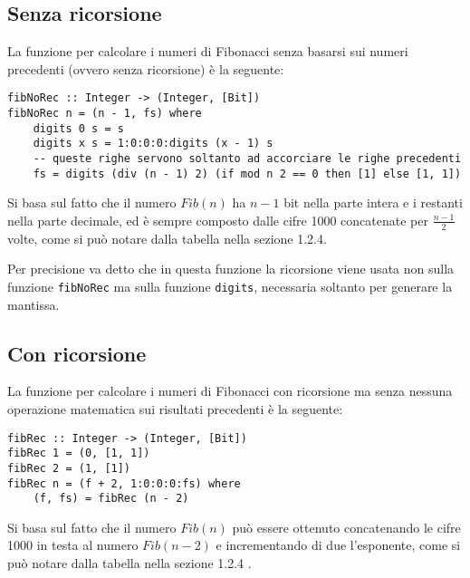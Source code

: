 \documentclass[Lau]{sapthesis}
\newcommand{\code}[1]{\colorbox{light-gray}{\texttt{#1}}}
\begin{document}
\subsection{Senza ricorsione}
La funzione per calcolare i numeri di Fibonacci senza basarsi sui numeri precedenti (ovvero senza ricorsione) è la seguente:
\begin{verbatim}
fibNoRec :: Integer -> (Integer, [Bit])
fibNoRec n = (n - 1, fs) where
    digits 0 s = s
    digits x s = 1:0:0:0:digits (x - 1) s
    -- queste righe servono soltanto ad accorciare le righe precedenti
    fs = digits (div (n - 1) 2) (if mod n 2 == 0 then [1] else [1, 1])
\end{verbatim}
Si basa sul fatto che il numero $Fib(n)$ ha $n-1$ bit nella parte intera e i restanti nella parte decimale, ed è sempre composto dalle cifre 1000 concatenate per $\frac{n-1}{2}$ volte, come si può notare dalla tabella nella sezione 1.2.4.

Per precisione va detto che in questa funzione la ricorsione viene usata non sulla funzione \code{fibNoRec} ma sulla funzione \code{digits}, necessaria soltanto per generare la mantissa.


\subsection{Con ricorsione}
La funzione per calcolare i numeri di Fibonacci con ricorsione ma senza nessuna operazione matematica sui risultati precedenti è la seguente:
\begin{verbatim}
fibRec :: Integer -> (Integer, [Bit])
fibRec 1 = (0, [1, 1])
fibRec 2 = (1, [1])
fibRec n = (f + 2, 1:0:0:0:fs) where
    (f, fs) = fibRec (n - 2)
\end{verbatim}
Si basa sul fatto che il numero $Fib(n)$ può essere ottenuto concatenando le cifre 1000 in testa al numero $Fib(n-2)$ e incrementando di due l'esponente, come si può notare dalla tabella nella sezione 1.2.4 \cite{navigli2018natural}.



\backmatter
\cleardoublepage
{}
{}


\end{document}
